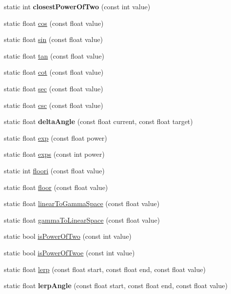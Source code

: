 \begin{DoxyCompactItemize}
\item 
\hypertarget{class_matth_a620766386242a964ad4c776f1209839f}{}static int {\bfseries closest\+Power\+Of\+Two} (const int value)\label{class_matth_a620766386242a964ad4c776f1209839f}

\item 
static float \hyperlink{class_matth_ab36b9435c9beb3f760d85b384826a032}{cos} (const float value)
\item 
static float \hyperlink{class_matth_afa0d084b15462e8c7e54b1bf4b0af288}{sin} (const float value)
\item 
static float \hyperlink{class_matth_ad09a3b61cc9e6a97f58bc6371f18e2ac}{tan} (const float value)
\item 
static float \hyperlink{class_matth_a94a0265fe56178120283cc50244ac8a9}{cot} (const float value)
\item 
static float \hyperlink{class_matth_a5224f6cd5d3920845d41942471b360a5}{sec} (const float value)
\item 
static float \hyperlink{class_matth_a33e26fbbf97fe67c24a7c14196b17c01}{csc} (const float value)
\item 
\hypertarget{class_matth_a3a3575a3f3db638f7e68bbbee42968ee}{}static float {\bfseries delta\+Angle} (const float current, const float target)\label{class_matth_a3a3575a3f3db638f7e68bbbee42968ee}

\item 
static float \hyperlink{class_matth_a75024342e85cc72f80c45d5a8f3564f1}{exp} (const float power)
\item 
static float \hyperlink{class_matth_ac4514a2a57c120f5b51719c7d95b3e8b}{exps} (const int power)
\item 
static int \hyperlink{class_matth_a7431c576ec39c974f575f040833f9d95}{floori} (const float value)
\item 
static float \hyperlink{class_matth_af380b2262ba103544e70d752287390e2}{floor} (const float value)
\item 
static float \hyperlink{class_matth_af61c67de0420e844f576b2b29c9daaef}{linear\+To\+Gamma\+Space} (const float value)
\item 
static float \hyperlink{class_matth_a94df1fe53e38f3200cb53a044ca82eb7}{gamma\+To\+Linear\+Space} (const float value)
\item 
static bool \hyperlink{class_matth_a0347598feecff1d5851f33324034f98c}{is\+Power\+Of\+Two} (const int value)
\item 
static bool \hyperlink{class_matth_a16bde0574496581105e37db358e81bf1}{is\+Power\+Of\+Twoe} (const int value)
\item 
static float \hyperlink{class_matth_a656a8b2b10a5270f247bb26d7f709537}{lerp} (const float start, const float end, const float value)
\item 
\hypertarget{class_matth_a6c969a645eb5824d6e698bce205460cd}{}static float {\bfseries lerp\+Angle} (const float start, const float end, const float value)\label{class_matth_a6c969a645eb5824d6e698bce205460cd}


\end{DoxyCompactItemize}
